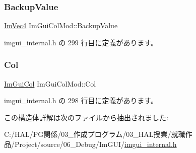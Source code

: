 \subsubsection{\texorpdfstring{Backup\+Value}{BackupValue}}
{\footnotesize\ttfamily \mbox{\hyperlink{struct_im_vec4}{Im\+Vec4}} Im\+Gui\+Col\+Mod\+::\+Backup\+Value}



 imgui\+\_\+internal.\+h の 299 行目に定義があります。

\mbox{\label{struct_im_gui_col_mod_aaa66ad29c378b8800098ab4d4e1c91a6}} 
\subsubsection{\texorpdfstring{Col}{Col}}
{\footnotesize\ttfamily \mbox{\hyperlink{imgui_8h_a1b0467ec582e731ae6292fef726fb5fe}{Im\+Gui\+Col}} Im\+Gui\+Col\+Mod\+::\+Col}



 imgui\+\_\+internal.\+h の 298 行目に定義があります。



この構造体詳解は次のファイルから抽出されました\+:\begin{DoxyCompactItemize}
\item 
C\+:/\+H\+A\+L/\+P\+G関係/03\+\_\+作成プログラム/03\+\_\+\+H\+A\+L授業/就職作品/\+Project/source/06\+\_\+\+Debug/\+Im\+G\+U\+I/\mbox{\hyperlink{imgui__internal_8h}{imgui\+\_\+internal.\+h}}\end{DoxyCompactItemize}
